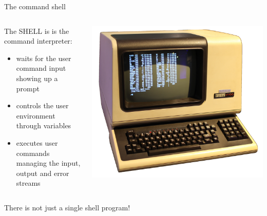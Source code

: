 \documentclass[unknownkeysallowed, 10pt, a4 paper, handout]{beamer}
\begin{document}
\begin{frame}[label=shell]{The command shell}
  \begin{columns}[T]
    \begin{column}{.56\textwidth}
    \small{
      The SHELL is is the command interpreter:
      \begin{itemize}
        \item waits for the user command input showing up a prompt 
        \item controls the user environment through variables
        \item executes user commands managing the input, output
                 and error streams
      \end{itemize}
      }
    \end{column}
    \hfill
    \begin{column}{.43\textwidth}
      \begin{center}
        \includegraphics[scale=0.4]{pics/vt100.png}
      \end{center}
    \end{column}
  \end{columns}
  \begin{center}
    There is not just a single shell program!
  \end{center}
\end{frame}
\end{document}

